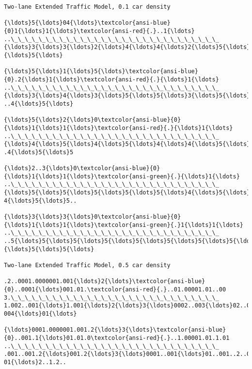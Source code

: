 \documentclass[11pt]{article}
\begin{document}
    \begin{Verbatim}[commandchars=\\\{\},fontsize=\footnotesize]
Two-lane Extended Traffic Model, 0.1 car density

{\ldots}5{\ldots}04{\ldots}\textcolor{ansi-blue}{0}1{\ldots}1{\ldots}\textcolor{ansi-red}{.}..1{\ldots}
..\_\_\_\_\_\_\_\_\_\_\_\_\_\_\_\_\_\_\_\_\_\_\_\_\_\_\_\_\_\_
{\ldots}3{\ldots}3{\ldots}2{\ldots}4{\ldots}4{\ldots}2{\ldots}5{\ldots}02..2..3
{\ldots}5{\ldots}

{\ldots}5{\ldots}1{\ldots}5{\ldots}\textcolor{ansi-blue}{0}.2{\ldots}1{\ldots}\textcolor{ansi-red}{.}{\ldots}1{\ldots}
..\_\_\_\_\_\_\_\_\_\_\_\_\_\_\_\_\_\_\_\_\_\_\_\_\_\_\_\_\_\_
{\ldots}3{\ldots}4{\ldots}3{\ldots}5{\ldots}5{\ldots}3{\ldots}5{\ldots}1..2..3.
..4{\ldots}5{\ldots}

{\ldots}5{\ldots}2{\ldots}0\textcolor{ansi-blue}{0}{\ldots}1{\ldots}1{\ldots}\textcolor{ansi-red}{.}{\ldots}1{\ldots}
..\_\_\_\_\_\_\_\_\_\_\_\_\_\_\_\_\_\_\_\_\_\_\_\_\_\_\_\_\_\_
{\ldots}4{\ldots}5{\ldots}4{\ldots}5{\ldots}4{\ldots}4{\ldots}5{\ldots}2{\ldots}3..
.4{\ldots}5{\ldots}5

{\ldots}2..3{\ldots}0\textcolor{ansi-blue}{0}{\ldots}1{\ldots}1{\ldots}\textcolor{ansi-green}{.}{\ldots}1{\ldots}
..\_\_\_\_\_\_\_\_\_\_\_\_\_\_\_\_\_\_\_\_\_\_\_\_\_\_\_\_\_\_
{\ldots}5{\ldots}5{\ldots}5{\ldots}5{\ldots}5{\ldots}4{\ldots}5{\ldots}3{\ldots}3{\ldots}
4{\ldots}5{\ldots}5..

{\ldots}3{\ldots}3{\ldots}0\textcolor{ansi-blue}{0}{\ldots}1{\ldots}1{\ldots}\textcolor{ansi-green}{.}1{\ldots}1{\ldots}
..\_\_\_\_\_\_\_\_\_\_\_\_\_\_\_\_\_\_\_\_\_\_\_\_\_\_\_\_\_\_
..5{\ldots}5{\ldots}5{\ldots}5{\ldots}5{\ldots}5{\ldots}5{\ldots}5{\ldots}3{\ldots}4.
{\ldots}5{\ldots}5{\ldots}

Two-lane Extended Traffic Model, 0.5 car density

.2..0001.0000001.001{\ldots}2{\ldots}\textcolor{ansi-blue}{0}..0001{\ldots}001.01.\textcolor{ansi-red}{.}..01.00001.01..00
3.\_\_\_\_\_\_\_\_\_\_\_\_\_\_\_\_\_\_\_\_\_\_\_\_\_\_\_\_\_\_
1.002..001{\ldots}1.001{\ldots}2{\ldots}3{\ldots}0002..003{\ldots}02..002..2..000002..00001.1.3{\ldots}1.1.
004{\ldots}01{\ldots}

{\ldots}0001.0000001.001.2{\ldots}3{\ldots}\textcolor{ansi-blue}{0}..001.1{\ldots}01.01.0\textcolor{ansi-red}{.}..1.00001.01.1.01
..\_\_\_\_\_\_\_\_\_\_\_\_\_\_\_\_\_\_\_\_\_\_\_\_\_\_\_\_\_\_
.001..001.2{\ldots}001.2{\ldots}3{\ldots}0001..001{\ldots}01..001..2..000001..00001.1.2{\ldots}1.1.0
01{\ldots}2..1.2..


\end{Verbatim}
\end{document}
